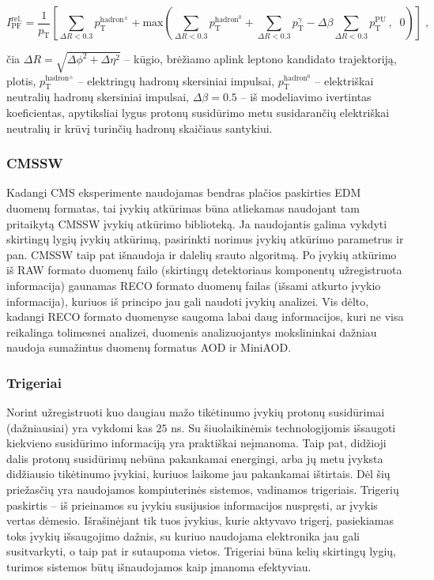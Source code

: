 \documentclass[a4paper, 12pt]{article}
\newlength\q
\begin{document}
\begin{equation}
	\label{eq:isolation}
	I^{\mathrm{rel.}}_{\mathrm{PF}} = \frac{1}{p_{\mathrm{T}}} 
	\left[ \sum_{\Delta R<0.3} p_{\mathrm{T}}^{\mathrm{hadron^{\pm}}} +
	\mathrm{max} \left( \sum_{\Delta R<0.3} p_{\mathrm{T}}^{\mathrm{hadron^0}} + 
	\sum_{\Delta R<0.3} p_{\mathrm{T}}^{\gamma} -
	\Delta \beta \sum_{\Delta R<0.3} p_{\mathrm{T}}^{\mathrm{PU}}
	\, ,\;\; 0 \right) \right] \; \mathrm{,}
\end{equation}

čia $\Delta R = \sqrt{\Delta \phi^{2} + \Delta \eta^{2}}$ -- kūgio, brėžiamo aplink leptono kandidato
trajektoriją, plotis, $p_{\mathrm{T}}^{\mathrm{hadron^{\pm}}}$ -- elektringų hadronų skersiniai impulsai,
$p_{\mathrm{T}}^{\mathrm{hadron^0}}$ -- elektriškai neutralių hadronų skersiniai impulsai,
$\Delta\beta=0.5$ -- iš modeliavimo ivertintas koeficientas, apytiksliai lygus protonų susidūrimo metu
susidarančių elektriškai neutralių ir krūvį turinčių hadronų skaičiaus santykiui.


\subsubsection*{CMSSW}

Kadangi CMS eksperimente naudojamas bendras plačios paskirties EDM duomenų formatas, tai įvykių atkūrimas
būna atliekamas naudojant tam pritaikytą CMSSW įvykių atkūrimo biblioteką.
Ja naudojantis galima vykdyti skirtingų lygių įvykių atkūrimą, pasirinkti norimus įvykių atkūrimo
parametrus ir pan.
CMSSW taip pat išnaudoja ir dalelių srauto algoritmą.
Po įvykių atkūrimo iš RAW formato duomenų failo (skirtingų detektoriaus komponentų užregistruota informacija)
gaunamas RECO formato duomenų failas (išsami atkurto įvykio informacija), kuriuos iš principo
jau gali naudoti įvykių analizei.
Vis dėlto, kadangi RECO formato duomenyse saugoma labai daug informacijos, kuri ne visa reikalinga tolimesnei
analizei, duomenis analizuojantys mokslininkai dažniau naudoja sumažintus duomenų formatus AOD ir MiniAOD.


\subsubsection{Trigeriai}\label{sec:trigger}

Norint užregistruoti kuo daugiau mažo tikėtinumo įvykių protonų susidūrimai (dažniausiai) yra vykdomi kas
$25$ ns.
Su šiuolaikinėmis technologijomis išsaugoti kiekvieno susidūrimo informaciją yra praktiškai neįmanoma.
Taip pat, didžioji dalis protonų susidūrimų nebūna pakankamai energingi, arba jų metu įvyksta didžiausio
tikėtinumo įvykiai, kuriuos laikome jau pakankamai ištirtais.
Dėl šių priežasčių yra naudojamos kompiuterinės sistemos, vadinamos trigeriais.
Trigerių paskirtis -- iš prieinamos su įvykiu susijusios informacijos nuspręsti, ar įvykis vertas dėmesio.
Išrašinėjant tik tuos įvykius, kurie aktyvavo trigerį, pasiekiamas toks įvykių išsaugojimo dažnis, su kuriuo
naudojama elektronika jau gali susitvarkyti, o taip pat ir sutaupoma vietos.
Trigeriai būna kelių skirtingų lygių, turimos sistemos būtų išnaudojamos kaip įmanoma efektyviau.
\end{document}
